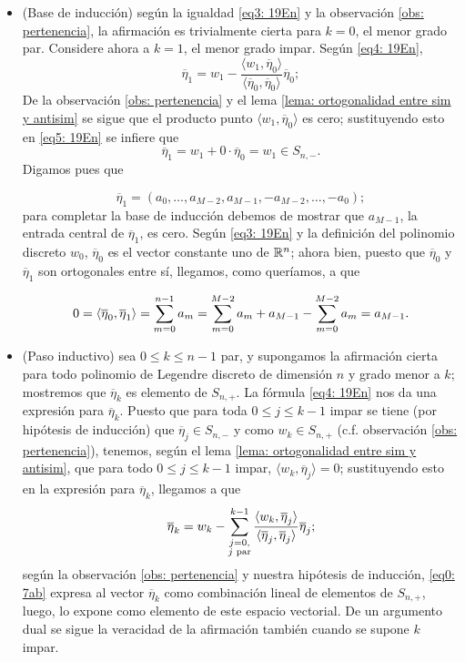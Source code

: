\begin{itemize}

\item (Base de inducción) según la igualdad
\eqref{eq3: 19En} y la observación 
\ref{obs: pertenencia}, la afirmación 
es trivialmente cierta para $k=0$, el menor grado par.
Considere ahora a $k=1$, el menor grado impar. Según 
\eqref{eq4: 19En}, 
\begin{equation}
\label{eq5: 19En}
\overline{\eta}_{1}= w_{1}
- \frac{\langle w_{1}, \overline{\eta}_{0} \rangle}
{\langle \overline{\eta}_{0}, \overline{\eta}_{0} \rangle}\overline{\eta}_{0};
\end{equation}
De la observación 
\ref{obs: pertenencia} y el lema
\ref{lema: ortogonalidad entre sim y antisim} se sigue
que el producto punto $\langle w_{1}, \overline{\eta}_{0} \rangle$
es cero; sustituyendo esto en \eqref{eq5: 19En}
se infiere que 
\[
\overline{\eta}_{1} = w_{1} + 0 \cdot \overline{\eta}_{0}=
w_{1} \in S_{n,-}.
\]
Digamos pues que

\[
\overline{\eta}_{1} = 
(a_{0}, \ldots , a_{M-2}, a_{M-1}, -a_{M-2}, \ldots , -a_{0} );
\]
para completar la base de inducción debemos de mostrar
que $a_{M-1}$, la entrada central de $\overline{\eta}_{1}$,
es cero. Según \eqref{eq3: 19En} y
la definición del polinomio discreto $w_{0}$, 
$\overline{\eta}_{0}$ es el vector constante uno de $\mathbb{R}^{n}$;
ahora bien, puesto que $\overline{\eta}_{0}$
y $\overline{\eta}_{1}$
son ortogonales entre sí, llegamos, como queríamos, a que

\[
0 = \langle \overline{\eta}_{0}, \overline{\eta}_{1}\rangle
= \sum\limits_{m=0}^{n-1}a_{m} = 
\sum\limits_{m=0}^{M-2}a_{m} + a_{M-1} -
\sum\limits_{m=0}^{M-2}a_{m} = a_{M-1}.
\]



\item (Paso inductivo) sea $0 \leq k \leq n-1$ par, y
supongamos la afirmación cierta para todo polinomio de Legendre
discreto de dimensión $n$ y grado menor a $k$;
mostremos que $\overline{\eta}_{k}$ es elemento de $S_{n,+}$.
La fórmula \eqref{eq4: 19En} nos da una expresión
para $\overline{\eta}_{k}$.
Puesto que
para toda $0 \leq j \leq k-1$ impar se tiene 
(por hipótesis de inducción) 
que $\overline{\eta}_{j} \in S_{n,-}$
y como $w_{k} \in S_{n,+}$ (c.f. observación 
\ref{obs: pertenencia}), tenemos, según el lema
\ref{lema: ortogonalidad entre sim y antisim}, que
para todo $0 \leq j \leq k-1$ impar, 
$\langle w_{k}, \overline{\eta}_{j} \rangle=0$;
sustituyendo esto en la expresión para 
$\overline{\eta}_{k}$, llegamos a que
\begin{equation}
\label{eq0: 7ab}
\overline{\eta}_{k}= w_{k}-
\sum\limits_{
\substack{ {j=0}, \\  {j\text{ par}}}
}^{k-1}
\frac{\langle w_{k}, \overline{\eta}_{j} \rangle}
{\langle \overline{\eta}_{j}, \overline{\eta}_{j} \rangle}\overline{\eta}_{j}
;
\end{equation}
según la observación \ref{obs: pertenencia}
y nuestra hipótesis de inducción, 
\eqref{eq0: 7ab} expresa al vector 
$\overline{\eta}_{k}$ como combinación lineal
de elementos de $S_{n,+}$, luego, lo expone como
elemento de este espacio vectorial. De un argumento
dual se sigue la veracidad de la afirmación también
cuando se supone $k$ impar.
\end{itemize}
